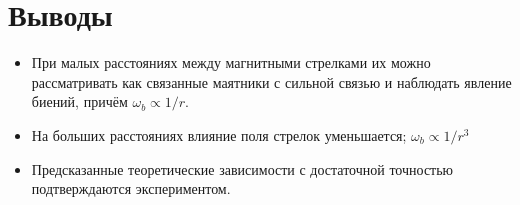 \documentclass{letask}
\begin{document}
\section{Выводы}
\begin{itemize}
\item При малых расстояниях между магнитными стрелками их можно рассматривать как связанные маятники с сильной связью и наблюдать явление биений, причём $\omega_b \propto 1/r$.

\item На больших расстояниях влияние поля стрелок уменьшается; $\omega_b \propto 1/r^3$

\item Предсказанные теоретические зависимости с достаточной точностью подтверждаются экспериментом.
\end{itemize}
\end{document}
